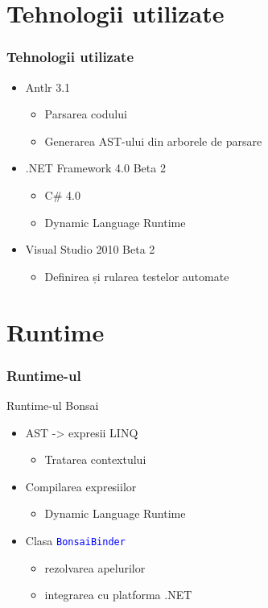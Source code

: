 \documentclass{beamer}
\renewcommand{\c}[1]{\textcolor{blue}{\texttt{#1}}}
\begin{document}
\section{Tehnologii utilizate}
\begin{frame}
  \frametitle{Tehnologii utilizate}
  \begin{itemize}
    \item 
      Antlr 3.1
      \begin{itemize}
      \item Parsarea codului
      \item Generarea AST-ului din arborele de parsare
      \end{itemize}
    \item
      .NET Framework 4.0 Beta 2
      \begin{itemize}
        \item C\# 4.0
        \item Dynamic Language Runtime
      \end{itemize}
    \item
      Visual Studio 2010 Beta 2
      \begin{itemize}
        \item Definirea și rularea testelor automate
      \end{itemize}
  \end{itemize}
\end{frame}

\section{Runtime}
\begin{frame}
  \frametitle{Runtime-ul}
  Runtime-ul Bonsai
  \begin{itemize}
  \item AST -> expresii LINQ
    \begin{itemize}
      \item Tratarea contextului
    \end{itemize}
  \item Compilarea expresiilor
    \begin{itemize}
      \item Dynamic Language Runtime
    \end{itemize}
  \item Clasa \c{BonsaiBinder}
    \begin{itemize}
      \item rezolvarea apelurilor
      \item integrarea cu platforma .NET
    \end{itemize}
  \end{itemize}
\end{frame}
\end{document}
